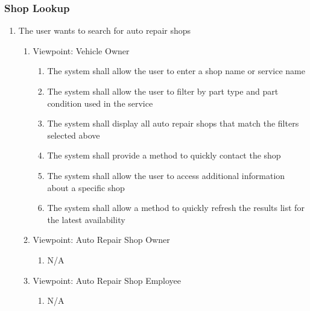 \documentclass[12pt]{article}
\begin{document}
\subsubsection{Shop Lookup}
\begin{enumerate}[resume*=business_events]
	\item The user wants to search for auto repair shops
	      \begin{enumerate}[VP\arabic*.]
		      \item Viewpoint: Vehicle Owner
		            \begin{enumerate}
			            \item The system shall allow the user to enter a shop name or service name
			            \item The system shall allow the user to filter by part type and part condition used in the service
			            \item The system shall display all auto repair shops that match the filters selected above
			            \item The system shall provide a method to quickly contact the shop
			            \item The system shall allow the user to access additional information about a specific shop
			            \item The system shall allow a method to quickly refresh the results list for the latest availability
		            \end{enumerate}
		      \item Viewpoint: Auto Repair Shop Owner
		            \begin{enumerate}
			            \item[] N/A
		            \end{enumerate}
		      \item Viewpoint: Auto Repair Shop Employee
		            \begin{enumerate}
			            \item[] N/A
		            \end{enumerate}
	      \end{enumerate}
\end{enumerate}
\end{document}
